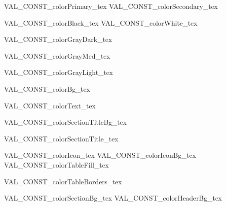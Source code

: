 
VAL_CONST_colorPrimary_tex
VAL_CONST_colorSecondary_tex

VAL_CONST_colorBlack_tex
VAL_CONST_colorWhite_tex

VAL_CONST_colorGrayDark_tex

VAL_CONST_colorGrayMed_tex

VAL_CONST_colorGrayLight_tex

VAL_CONST_colorBg_tex

VAL_CONST_colorText_tex

VAL_CONST_colorSectionTitleBg_tex

VAL_CONST_colorSectionTitle_tex


VAL_CONST_colorIcon_tex
VAL_CONST_colorIconBg_tex
VAL_CONST_colorTableFill_tex

\renewcommand{\setColorCell}{%
    \cellcolor{colorTableFill}%
}
VAL_CONST_colorTableBorders_tex



VAL_CONST_colorSectionBg_tex
VAL_CONST_colorHeaderBg_tex
